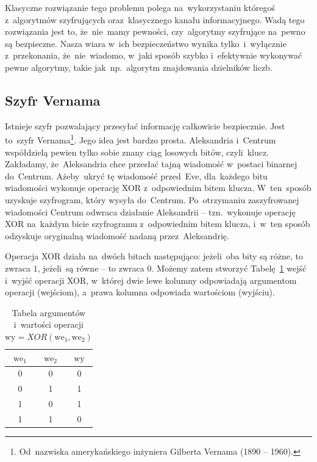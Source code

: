 Klasyczne rozwiązanie tego problemu polega na~wykorzystaniu któregoś
z~algorytmów szyfrujących oraz~klasycznego kanału informacyjnego. Wadą tego
rozwiązania jest to, że~nie~mamy pewności, czy~algorytmy szyfrujące na~pewno są
bezpieczne. Nasza wiara w~ich bezpieczeństwo wynika tylko~i~wyłącznie
z~przekonania, że~nie~wiadomo, w~jaki sposób szybko i~efektywnie wykonywać pewne
algorytmy, takie jak~np.~algorytm znajdowania dzielników liczb.

\subsection{Szyfr Vernama}
Istnieje szyfr pozwalający przesyłać informację całkowicie bezpiecznie.
Jest to~szyfr Vernama\footnote{Od~nazwiska amerykańskiego inżyniera Gilberta Vernama
	(1890 -- 1960).}. Jego idea jest bardzo prosta.
Aleksandria i~Centrum
współdzielą pewien tylko sobie znany ciąg losowych bitów, czyli~klucz. Zakładamy,
że~Aleksandria chce przesłać tajną wiadomość w~postaci binarnej do~Centrum. Ażeby~ukryć
tę wiadomość przed~Eve, dla~każdego bitu wiadomości wykonuje operację XOR
z~odpowiednim bitem klucza. W~ten~sposób uzyskuje szyfrogram, który wysyła do~Centrum.
Po~otrzymaniu zaszyfrowanej wiadomości Centrum odwraca działanie Aleksandrii -- tzn.~wykonuje operację XOR na~każdym
bicie szyfrogramu z~odpowiednim bitem klucza, i~w~ten sposób odzyskuje oryginalną wiadomość
nadaną przez~Aleksandrię.

Operacja XOR działa na~dwóch bitach następująco: jeżeli~oba bity są różne, to
zwraca $1$, jeżeli~są równe -- to zwraca $0$.
Możemy zatem stworzyć Tabelę~\ref{tab:xor} wejść i~wyjść operacji XOR, w~której
dwie lewe kolumny odpowiadają argumentom operacji (wejściom), a~prawa kolumna
odpowiada wartościom (wyjściu).

\begin{table}[h!]
	\centering
	\begin{tabular}{ccc}
		$\text{we}_1$ & $\text{we}_2$ & $\text{wy}$ \\
		\toprule
		0             & 0             & 0           \\
		0             & 1             & 1           \\
		1             & 0             & 1           \\
		1             & 1             & 0
	\end{tabular}
	\caption{Tabela argumentów i~wartości operacji $\text{wy}=XOR(\text{we}_1, \text{we}_2)$}
	\label{tab:xor}
\end{table}


